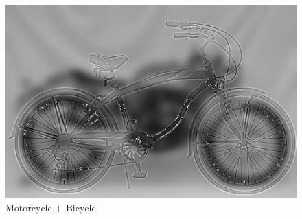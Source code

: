 \documentclass{article}
\begin{document}
\begin{minipage}{\linewidth}
     \begin{minipage}{0.45\linewidth}
        \begin{figure}[H]
            \includegraphics[width=\linewidth]{Ejercicio3/hybrid5.png}          
			\caption{Motorcycle + Bicycle}
        \end{figure}
    \end{minipage}
\end{minipage}
\end{document}
